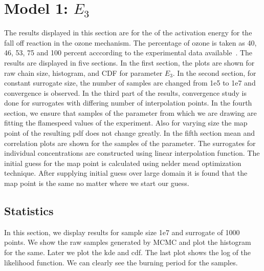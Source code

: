 \section{Model 1: $E_3$}

The results displayed in this section are for the
of the activation energy for the fall off reaction in the ozone
mechanism. The percentage of ozone is taken as 40, 46, 53, 75 and 100
percent acccording to the experimental data
available~\cite{Streng}. The results are displayed in five
sections. In the
first section, the plots are shown for raw chain size, histogram, and CDF
for parameter $E_3$. In the second section, for
constant surrogate size, the number of samples are changed from 1e5 to
1e7 and convergence is observed. In the third part of the results,
convergence study is done for surrogates with differing number of
interpolation points. In the
fourth section, we ensure that samples of the parameter from which we are
drawing are fitting the flamespeed values of the experiment. Also for
varying size the map point of the resulting pdf does not change
greatly. In the fifth section mean and correlation plots are shown for
the samples of the parameter. The surrogates for individual
concentrations are constructed using linear interpolation
function. The initial guess for the map point is calculated using
nelder mead optimization technique. After supplying initial guess over
large domain it is found that the map point is the same no matter
where we start our guess.

\subsection{ Statistics }

 In this section, we display results for sample size 1e7 and surrogate
 of 1000 points. We show the raw samples generated by MCMC and plot
 the histogram for the same. Later we plot the kde and cdf. The last
 plot shows the log of the likelihood function. We can clearly see the
 burning period for the samples.

